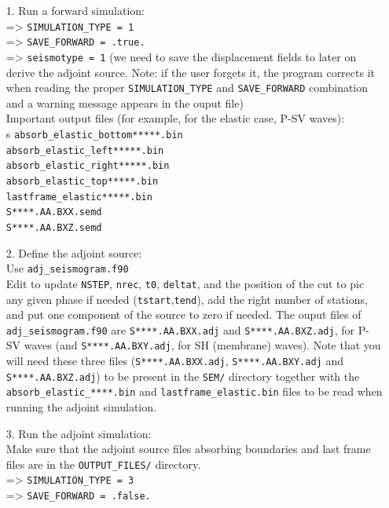\documentclass[oneside,english,onecolumn,letterpaper]{book}
\begin{document}
\begin{enumerate}
\item[1.] Run a forward simulation: \\
=> \texttt{SIMULATION\_TYPE = 1} \\
=> \texttt{SAVE\_FORWARD = .true.}\\
=> \texttt{seismotype = 1} (we need to save the displacement fields to later on derive the
adjoint source. Note: if the user forgets it, the program corrects it when reading the proper
\texttt{SIMULATION\_TYPE} and \texttt{SAVE\_FORWARD} combination and a warning message appears in the ouput
file)\\

Important output files (for example, for the elastic case, P-SV waves): \\s
\texttt{absorb\_elastic\_bottom*****.bin}\\
\texttt{absorb\_elastic\_left*****.bin}\\
\texttt{absorb\_elastic\_right*****.bin}\\
\texttt{absorb\_elastic\_top*****.bin}\\
\texttt{lastframe\_elastic*****.bin}\\
\texttt{S****.AA.BXX.semd}\\
\texttt{S****.AA.BXZ.semd}\\

\item[2.] Define the adjoint source: \\
Use \texttt{adj\_seismogram.f90}\\
Edit to update \texttt{NSTEP}, \texttt{nrec}, \texttt{t0}, \texttt{deltat}, and the position of the cut to pic
any given phase if needed (\texttt{tstart},\texttt{tend}), add the right number of stations, and
put one component of the source to zero if needed.
The ouput files of \texttt{adj\_seismogram.f90} are \texttt{S****.AA.BXX.adj} and \texttt{S****.AA.BXZ.adj}, for P-SV waves (and
\texttt{S****.AA.BXY.adj}, for SH (membrane) waves). Note that you will need these three
files (\texttt{S****.AA.BXX.adj}, \texttt{S****.AA.BXY.adj} and \texttt{S****.AA.BXZ.adj}) to be present in the \texttt{SEM/} directory
together with the \texttt{absorb\_elastic\_****.bin} and \texttt{lastframe\_elastic.bin} files to be read
when running the adjoint simulation.\\

\item[3.] Run the adjoint simulation: \\
Make sure that the adjoint source files absorbing boundaries and last frame files are
in the \texttt{OUTPUT\_FILES/} directory.\\
=> \texttt{SIMULATION\_TYPE = 3}\\
=> \texttt{SAVE\_FORWARD = .false.}\\


\end{enumerate}
\end{document}
